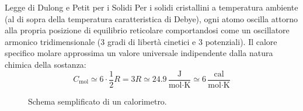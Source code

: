\begin{teorema}{Legge di Dulong e Petit per i Solidi}
Per i solidi cristallini a temperatura ambiente (al di sopra della temperatura caratteristica di Debye), ogni atomo oscilla attorno alla propria posizione di equilibrio reticolare comportandosi come un oscillatore armonico tridimensionale (3 gradi di libertà cinetici e 3 potenziali). Il calore specifico molare approssima un valore universale indipendente dalla natura chimica della sostanza:
\begin{equation}
    \boxed{ C_{\text{mol}} \simeq 6 \cdot \frac{1}{2}R = 3R \simeq 24.9 \, \frac{\text{J}}{\text{mol} \cdot \text{K}} \simeq 6 \, \frac{\text{cal}}{\text{mol} \cdot \text{K}} }
\end{equation}
\end{teorema}

\begin{figure}[ht]
\centering
{}
\caption{Schema semplificato di un calorimetro.}
\end{figure}

